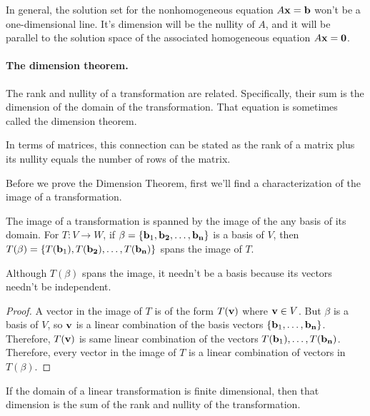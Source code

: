
In general, the solution set for the nonhomogeneous
equation $A{\bf x}={\bf b}$ won't be a one-dimensional line.  It's dimension
will be the nullity of $A$, and it will be parallel to the solution space of the
associated homogeneous equation $A{\bf x}={\bf 0}$.

\paragraph{The dimension theorem.} 

The rank and nullity of a transformation are related.  Specifically, their sum is the dimension of the domain of the transformation.  That equation is sometimes called the dimension theorem.

In terms of matrices, this connection can be stated as the rank of a matrix plus its nullity  equals the number of rows of the matrix.

Before we prove the Dimension Theorem, first we'll find a characterization of the image of a transformation.

\begin{theorem}
The image of a transformation is spanned by the image of the any basis of its domain.  For $T:V\to W$, if $\beta=\{{\bf b}_1,{\bf b_2},\ldots,{\bf b_n}\}$ is a basis of $V$, then
$T(\beta)=\{T({\bf b}_1),T({\bf b_2}),\ldots,T({\bf b_n})\}$ spans the image of $T$.
\end{theorem}

Although $T(\beta)$ spans the image, it needn't be a basis because its vectors needn't be independent.

\begin{proof}
A vector in the image of $T$ is of the form $T({\bf v})$ where ${\bf v}\in V$.  But $\beta$ is a basis of $V$, so $\bf v$ is a linear combination of the basis vectors $\{{\bf b}_1,\ldots,{\bf b_n}\}$.  Therefore,
$T({\bf v})$ is same linear combination of the vectors $T({\bf b}_1),\ldots,T({\bf b_n})$.  Therefore, every vector in the image of $T$ is a linear combination of vectors in $T(\beta)$.
\end{proof}

\begin{theorem}
If the domain of a linear transformation is finite dimensional, then that dimension is the sum of the rank and nullity of the transformation.
\end{theorem}

